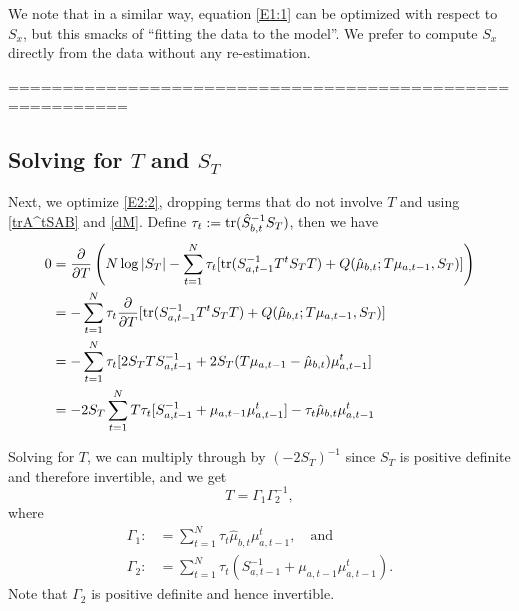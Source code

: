 \documentclass[12pt,leqno]{article}
\begin{document}
We note that in a similar way, equation \eqref{E1:1} can be optimized with respect to $S_x$, but this smacks of
``fitting the data to the model''.  We prefer to compute $S_x$ directly from the data without any re-estimation.

=========================================================
 
    
\subsection{Solving for $T$ and $S_T$}
Next, we optimize \eqref{E2:2}, dropping terms that do not involve $T$ and using \eqref{trA^tSAB} and
\eqref{dM}.  Define $\tau_t := \text{\rm tr}(\hat{S}_{b,t}^{-1}S_T)$, then we have 
  \begin{align*}
    0 &= \frac{\partial}{\partial{T}} \left(N\log|S_T|  - \sum_{t=1}^N\tau_t[\text{\rm tr}(S_{a,t-1}^{-1}T^tS_TT) + Q(\hat{\mu}_{b,t};T\mu_{a,t-1},S_T)]\right)\\
    &= - \sum_{t=1}^N\tau_t\frac{\partial}{\partial{T}}[\text{\rm tr}(S_{a,t-1}^{-1}T^tS_TT) + Q(\hat{\mu}_{b,t};T\mu_{a,t-1},S_T)]\\
      &= - \sum_{t=1}^N\tau_t[2S_TTS_{a,t-1}^{-1} + 2S_T(T\mu_{a,t-1} - \hat{\mu}_{b,t})\mu_{a,t-1}^t]\\
       &= -2S_T\sum_{t=1}^NT\tau_t[S_{a,t-1}^{-1} + \mu_{a,t-1}\mu_{a,t-1}^t] - \tau_t\hat{\mu}_{b,t}\mu_{a,t-1}^t
  \end{align*}

  Solving for $T$, we can multiply through by $(-2S_T)^{-1}$ since $S_T$ is positive definite and therefore
  invertible, and we get
\begin{equation}\label{T}
  T = \Gamma_1\Gamma_2^{-1},
\end{equation}
where
\begin{align*}
 \Gamma_1 :&= \sum_{t=1}^N\tau_t\hat{\mu}_{b,t}\mu_{a,t-1}^t, \quad\text{and}\\
\Gamma_2 :&= \sum_{t=1}^N\tau_t(S_{a,t-1}^{-1} + \mu_{a,t-1}\mu_{a,t-1}^t).
\end{align*}
Note that $\Gamma_2$ is positive definite and hence invertible.
\newpage
\appendix
\end{document}
